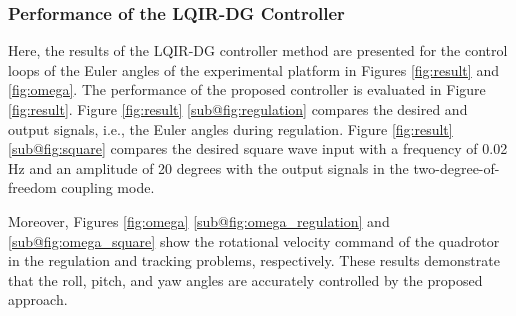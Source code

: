 \documentclass[3p,times]{elsarticle}
\begin{document}



\subsubsection{Performance of the LQIR-DG Controller}\label{sec:regulation}
\noindent Here, the results of the LQIR-DG controller method are presented for the control loops of the Euler angles of the experimental platform in Figures \ref{fig:result} and \ref{fig:omega}.
The performance of the proposed controller is evaluated in Figure \ref{fig:result}.
Figure \ref{fig:result} \ref{sub@fig:regulation} compares the desired and output signals, i.e., the Euler angles during regulation. Figure \ref{fig:result} \ref{sub@fig:square} compares the desired square wave input with a frequency of 0.02 Hz and an amplitude of 20 degrees with the output signals in the two-degree-of-freedom coupling mode.

Moreover, Figures \ref{fig:omega} \ref{sub@fig:omega_regulation} and \ref{sub@fig:omega_square} show the rotational velocity command of the quadrotor in the regulation and tracking problems, respectively. These results demonstrate that the roll, pitch, and yaw angles are accurately controlled by the proposed approach.
\end{document}
